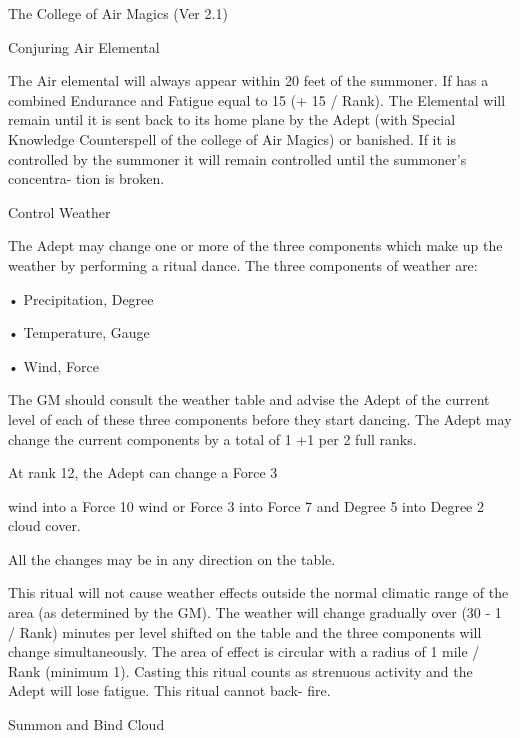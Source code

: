 \begin{Chapter}{The College of Air Magics (Ver 2.1)}
\begin{ritual}[R-2]{Conjuring Air Elemental}
\begin{effects}
The Air elemental will always appear within 20 feet of the summoner.
If has a combined Endurance and Fatigue equal to 15 (+ 15 / Rank).
The Elemental will remain until it is sent back to its home plane by
the Adept (with Special Knowledge Counterspell of the college of Air
Magics) or banished.  If it is controlled by the summoner it will
remain controlled until the summoner’s concentra- tion is broken.
\end{effects}
\end{ritual}

\begin{ritual}[R-3]{Control Weather}

\begin{effects}
The Adept may change one or more of the three components which make up
the weather by performing a ritual dance. The three components of
weather are:

• Precipitation, Degree  

• Temperature, Gauge  

• Wind, Force 

The GM should consult the weather table and advise the Adept of the
current level of each of these three components before they start
dancing.  The Adept may change the current components by a total of 1
+1 per 2 full ranks.

At rank 12, the Adept can change a Force 3 
\begin{example}
wind into a Force 10 wind or Force 3 into Force 7 and Degree 5 into
Degree 2 cloud cover.
\end{example}

All the changes may be in any direction on the table.

This ritual will not cause weather effects outside the normal climatic
range of the area (as determined by the GM).  The weather will change
gradually over (30 - 1 / Rank) minutes per level shifted on the table
and the three components will change simultaneously. The area of
effect is circular with a radius of 1 mile / Rank (minimum 1).
Casting this ritual counts as strenuous activity and the Adept will
lose fatigue. This ritual cannot back- fire.
\end{effects}
\end{ritual}

\begin{ritual}[R-4]{Summon and Bind Cloud}


\end{ritual}
\end{Chapter}
